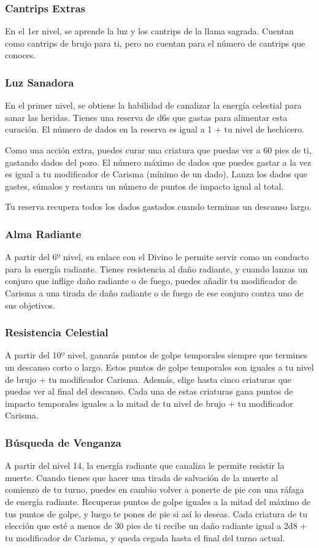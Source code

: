 \documentclass[a4paper,twocolumn,openany,10pt]{dndbook}
\begin{document}
\subsubsection{Cantrips Extras}
En el 1er nivel, se aprende la luz y los cantrips de la llama sagrada. Cuentan como cantrips de brujo para ti, pero no cuentan
para el número de cantrips que conoces.

\subsubsection{Luz Sanadora}
En el primer nivel, se obtiene la habilidad de canalizar la energía celestial para sanar las heridas. Tienes una reserva de d6s
que gastas para alimentar esta curación. El número de dados en la reserva es igual a 1 + tu nivel de hechicero.

Como una acción extra, puedes curar una criatura que puedas ver a 60 pies de ti, gastando dados del pozo. El número máximo de
dados que puedes gastar a la vez es igual a tu modificador de Carisma (mínimo de un dado). Lanza los dados que gastes, súmalos
y restaura un número de puntos de impacto igual al total.

Tu reserva recupera todos los dados gastados cuando terminas un descanso largo.

\subsubsection{Alma Radiante}
A partir del 6º nivel, su enlace con el Divino le permite servir como un conducto para la energía radiante. Tienes resistencia
al daño radiante, y cuando lanzas un conjuro que inflige daño radiante o de fuego, puedes añadir tu modificador de Carisma a
una tirada de daño radiante o de fuego de ese conjuro contra uno de sus objetivos.

\subsubsection{Resistencia Celestial}
A partir del 10º nivel, ganarás puntos de golpe temporales siempre que termines un descanso corto o largo. Estos puntos de
golpe temporales son iguales a tu nivel de brujo + tu modificador Carisma. Además, elige hasta cinco criaturas que puedas ver
al final del descanso. Cada una de estas criaturas gana puntos de impacto temporales iguales a la mitad de tu nivel de brujo +
tu modificador Carisma.

\subsubsection{Búsqueda de Venganza}
A partir del nivel 14, la energía radiante que canaliza le permite resistir la muerte. Cuando tienes que hacer una tirada de
salvación de la muerte al comienzo de tu turno, puedes en cambio volver a ponerte de pie con una ráfaga de energía radiante.
Recuperas puntos de golpe iguales a la mitad del máximo de tus puntos de golpe, y luego te pones de pie si así lo deseas. Cada
criatura de tu elección que esté a menos de 30 pies de ti recibe un daño radiante igual a 2d8 + tu modificador de Carisma, y
queda cegada hasta el final del turno actual.
\end{document}
